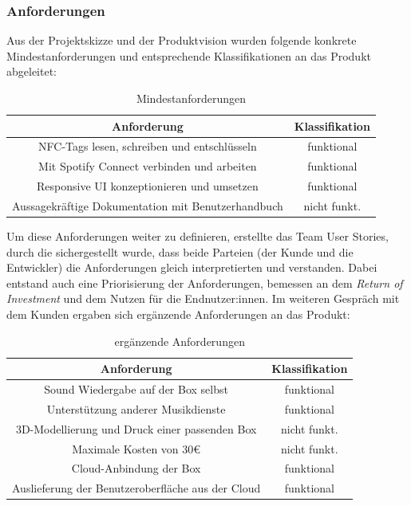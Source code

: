 \documentclass[10pt, a4paper]{article}
\begin{document}
\begin{onehalfspace}
\subsubsection{Anforderungen}
Aus der Projektskizze und der Produktvision wurden folgende konkrete Mindestanforderungen und entsprechende Klassifikationen an das Produkt abgeleitet:
\begin{center}
  \begin{table}[h!]
    \begin{tabular}{c|c}
      Anforderung & Klassifikation\\
      \hline
      NFC-Tags lesen, schreiben und entschlüsseln & funktional  \\
      Mit Spotify Connect verbinden und arbeiten & funktional \\
      Responsive UI konzeptionieren und umsetzen & funktional  \\
      Aussagekräftige Dokumentation mit Benutzerhandbuch & nicht funkt.  \\
    \end{tabular}
    \caption{\label{mind-anforderungen}Mindestanforderungen}
\end{table}
\end{center}

Um diese Anforderungen weiter zu definieren, erstellte das Team User Stories,
durch die sichergestellt wurde, dass beide Parteien (der Kunde und die Entwickler) die Anforderungen  gleich interpretierten und verstanden.
Dabei entstand auch eine Priorisierung der Anforderungen, bemessen an dem \textit{Return of Investment} und dem Nutzen für die Endnutzer:innen.
Im weiteren Gespräch mit dem Kunden ergaben sich ergänzende Anforderungen an das Produkt:
\begin{center}
  \begin{table}[h!]
    \begin{tabular}{c|c}
    Anforderung & Klassifikation \\
    \hline
    Sound Wiedergabe auf der Box selbst & funktional  \\
    Unterstützung anderer Musikdienste & funktional \\
    3D-Modellierung und Druck einer passenden Box & nicht funkt.  \\
    Maximale Kosten von 30€ & nicht funkt.  \\
    Cloud-Anbindung der Box & funktional \\
    Auslieferung der Benutzeroberfläche aus der Cloud & funktional \\
    \end{tabular}
    \caption{\label{erg-anforderungen}ergänzende Anforderungen}
  \end{table}
\end{center}


\end{onehalfspace}
\end{document}
